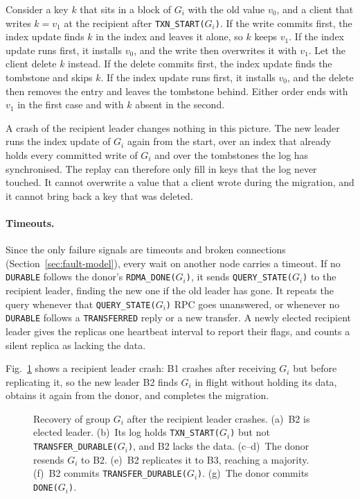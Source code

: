 Consider a key $k$ that sits in a block of $G_i$ with the old value $v_0$, and a client that
writes $k = v_1$ at the recipient after \texttt{TXN\_START($G_i$)}.
If the write commits first, the index update finds $k$ in the index and leaves it alone, so $k$
keeps $v_1$.
If the index update runs first, it installs $v_0$, and the write then overwrites it with $v_1$.
Let the client delete $k$ instead.
If the delete commits first, the index update finds the tombstone and skips $k$.
If the index update runs first, it installs $v_0$, and the delete then removes the entry and
leaves the tombstone behind.
Either order ends with $v_1$ in the first case and with $k$ absent in the second.

A crash of the recipient leader changes nothing in this picture.
The new leader runs the index update of $G_i$ again from the start, over an index that already
holds every committed write of $G_i$ and over the tombstones the log has synchronised.
The replay can therefore only fill in keys that the log never touched.
It cannot overwrite a value that a client wrote during the migration, and it cannot bring back
a key that was deleted.


\paragraph{Timeouts.}
Since the only failure signals are timeouts and broken connections (Section~\ref{sec:fault-model}), every wait on another node carries a timeout.
If no \texttt{DURABLE} follows the donor's \texttt{RDMA\_DONE($G_i$)}, it sends \texttt{QUERY\_STATE($G_i$)} to the recipient leader, finding the new one if the old leader has gone.
It repeats the query whenever that \texttt{QUERY\_STATE($G_i$)} RPC goes unanswered, or whenever no \texttt{DURABLE} follows a \texttt{TRANSFERRED} reply or a new transfer.
A newly elected recipient leader gives the replicas one heartbeat interval to report their flags, and counts a silent replica as lacking the data.


\iffalse
Fig.~\ref{fig:recipient_recovery} shows a recipient leader crash: B1 crashes after receiving $G_i$ but before replicating it, so the new leader B2 finds $G_i$ in flight without holding its data, obtains it again from the donor, and completes the migration.

\begin{figure}[t]
  \centering
  
  \caption{Recovery of group $G_i$ after the recipient leader crashes.
  (a)~B2 is elected leader.
  (b)~Its log holds \texttt{TXN\_START($G_i$)} but not \texttt{TRANSFER\_DURABLE($G_i$)}, and B2 lacks the data.
  (c--d)~The donor resends $G_i$ to B2.
  (e)~B2 replicates it to B3, reaching a majority.
  (f)~B2 commits \texttt{TRANSFER\_DURABLE($G_i$)}.
  (g)~The donor commits \texttt{DONE($G_i$)}.}
  \label{fig:recipient_recovery}
\end{figure}


